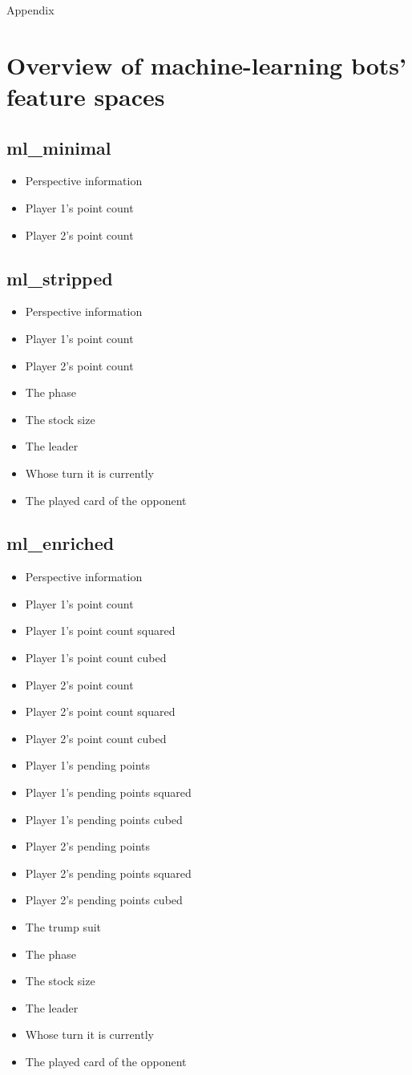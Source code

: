 \documentclass[a4paper,11pt]{article}
\begin{document}
Appendix
\section{Overview of machine-learning bots' feature spaces}
\subsection{ml\_minimal}
\begin{itemize}
\item Perspective information
\item Player 1's point count
\item Player 2's point count
\end{itemize}
\subsection{ml\_stripped}
\begin{itemize}
\item Perspective information
\item Player 1's point count
\item Player 2's point count
\item The phase
\item The stock size
\item The leader
\item Whose turn it is currently
\item The played card of the opponent
\end{itemize}
\subsection{ml\_enriched}
\begin{itemize}
\item Perspective information
\item Player 1's point count
\item Player 1's point count squared
\item Player 1's point count cubed
\item Player 2's point count
\item Player 2's point count squared
\item Player 2's point count cubed
\item Player 1's pending points
\item Player 1's pending points squared
\item Player 1's pending points cubed
\item Player 2's pending points
\item Player 2's pending points squared
\item Player 2's pending points cubed
\item The trump suit
\item The phase
\item The stock size
\item The leader
\item Whose turn it is currently
\item The played card of the opponent
\end{itemize}
\end{document}
